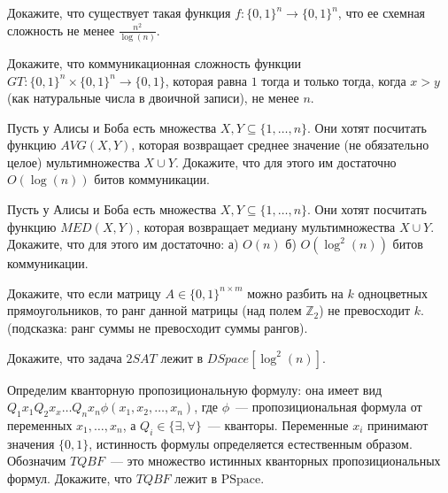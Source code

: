 \setcounter{curtask}{1}

\mytitle{}

\begin{task}
    Докажите, что существует такая функция $f: \{0, 1\}^{n}
    \rightarrow \{0, 1\}^n$, что ее схемная сложность не менее
    $\frac{n^2}{\log(n)}$.  
\end{task}


\begin{task}
    Докажите, что коммуникационная сложность функции $GT: \{0, 1\}^n \times \{0,
    1\}^n \rightarrow \{0, 1\}$, которая равна $1$ тогда и только тогда,
    когда $x > y$ (как натуральные числа в двоичной записи), не менее $n$.
\end{task}

\begin{task}
    Пусть у Алисы и Боба есть множества $X, Y \subseteq \{1, \dots, n\}$. Они хотят
    посчитать функцию $AVG(X, Y)$, которая возвращает среднее значение (не
    обязательно целое) мультимножества $X \cup Y$. Докажите, что для этого им
    достаточно $O(\log(n))$ битов коммуникации.
\end{task}

\begin{task}
    Пусть у Алисы и Боба есть множества $X, Y \subseteq \{1, \dots, n\}$. Они хотят
    посчитать функцию $MED(X, Y)$, которая возвращает медиану мультимножества $X \cup
    Y$. Докажите, что для этого им достаточно:
    а) $O(n)$ б) $O(\log^2(n))$ битов коммуникации.
\end{task}

\begin{task}
    Докажите, что если матрицу $A \in \{0, 1\}^{n \times m}$ можно разбить на $k$
    одноцветных прямоугольников, то ранг данной матрицы (над полем $\mathbb{Z}_2$) не
    превосходит $k$. (подсказка: ранг суммы не превосходит суммы рангов).
\end{task}



\breakline

\begin{ptask}{41}
	Докажите, что задача $2SAT$ лежит в $DSpace[\log^2(n)]$.    
\end{ptask}

\begin{ptask}{42}
	Определим кванторную пропозициональную формулу: она имеет вид \\
    $Q_1 x_1 Q_2 x_x \dots Q_n x_n \phi(x_1, x_2, \dots, x_n)$, где $\phi$~---
    пропозициональная формула от переменных $x_1, \dots, x_n$, а $Q_i \in \{\exists,
    \forall\}$~--- кванторы. Переменные $x_i$ принимают значения $\{0, 1\}$,
    истинность формулы определяется естественным образом. Обозначим $TQBF$~--- это
    множество истинных кванторных пропозициональных формул. Докажите, что $TQBF$
    лежит в $\mathrm{PSpace}$.
\end{ptask}

